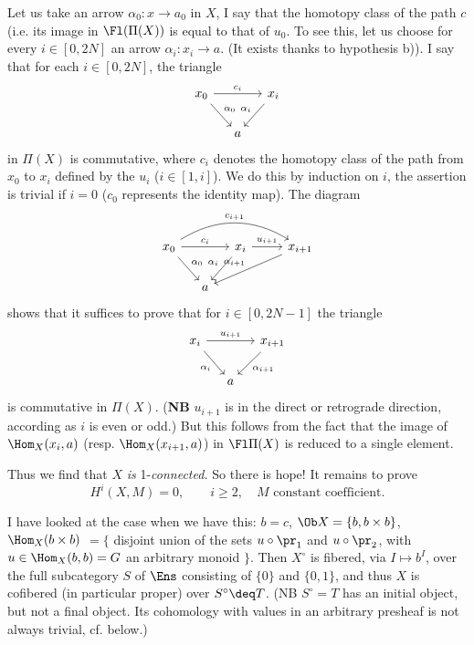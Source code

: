 Let us take an arrow $\alpha_0 : x\longrightarrow a_0$ in $X$, I say that the %
homotopy class of the path $c$ (i.e. its image in $\Fl(\Pi(X))$ is equal to that of $u_0$. %
To see this, let us choose for every $i\in[0,2N]$ an arrow $\alpha_i : x_i\longrightarrow a$. (It exists thanks to hypothesis b)). I say that for each $i\in[0,2N]$, the triangle
\[
\begin{tikzcd}[column sep=small]
x_0 \arrow[rr, "c_i"] \arrow[dr, "\alpha_0"] & & x_i \arrow[dl, "\alpha_i"'] \\
& a &
\end{tikzcd}
\]
in $\Pi(X)$ is commutative, where $c_i$ denotes the homotopy class of the path from $x_0$ to $x_i$ defined by the $u_i$ ($i\in[1,i]$). We do this by induction on $i$, the assertion is trivial if $i = 0$ ($c_0$ represents the identity map). The diagram %
\[
\begin{tikzcd}[column sep=small]
x_0 \arrow[rr, "c_i"] \arrow[dr, "\alpha_0"] \arrow[rrrr, bend left=32, "c_{i+1}"] & & x_i \arrow[dl, "\alpha_i"'] \arrow[rr, "u_{i+1}"] & & x_{i+1} \arrow[dlll, "\alpha_{i+1}"'] \\ %
& a & & &
\end{tikzcd}
\]
shows that it suffices to prove that for $i\in[0,2N-1]$ the triangle
\[
\begin{tikzcd}[column sep=small]
x_i \arrow[rr, "u_{i+1}"] \arrow[dr, "\alpha_i"'] & & x_{i+1} \arrow[dl, "\alpha_{i+1}"] \\
& a &
\end{tikzcd}
\]
is commutative in $\Pi(X)$. (\textbf{NB} $u_{i+1}$ is in the direct or retrograde direction, according as %
$i$ is even or odd.) But this follows from the fact that the image of $\Hom_X(x_i,a)$ (resp. $\Hom_X(x_{i+1},a)$) %
in $\Fl\Pi(X)$ is reduced to a single element.

Thus we find that $X$ \textit{is} 1-\textit{connected.} So there is hope! It remains to prove
\[
H^i(X,M) = 0, \qquad i\geq 2, \quad M \text{ constant coefficient.}
\]

I have looked at the case when we have this: $b = c$, $\Ob X = \{b, b\times b\}$, $\Hom_X(b\times b)$ $= \{$ disjoint union of the sets $u\circ\pr_1$ and $u\circ\pr_2$, with $u\in\Hom_X(b,b) = G$ an arbitrary monoid $\}$. Then $X^\circ$ is fibered, via $I\longmapsto b^I$, over the full subcategory $S$ of $\Ens$ consisting of $\{0\}$ and $\{0,1\}$, and thus $X$ is cofibered (in particular proper) over $S^\circ \deq T$. (NB $S^\circ = T$ has an initial object, but not a final object. Its cohomology with values in an arbitrary presheaf is not always trivial, cf. below.)


